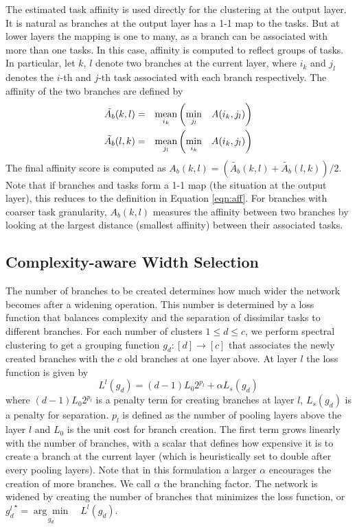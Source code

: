 \documentclass[10pt,twocolumn,letterpaper]{article}
\begin{document}
The estimated task affinity is used directly for the clustering at the output layer. It is natural as branches at the output layer has a 1-1 map to the tasks. But at lower layers the mapping is one to many, as a branch can be associated with more than one tasks. In this case, affinity is computed to reflect groups of tasks. In particular, let $k$, $l$ denote two branches at the current layer, where $i_{k}$ and $j_{l}$ denotes the $i$-th and $j$-th task associated with each branch respectively. The affinity of the two branches are defined by
\begin{eqnarray}
\vspace{-1mm}
\label{eqn:between_sep}
\tilde{A_b}(k, l) &=& \underset{i_k}{\mbox{mean}}\left(\underset{j_l}{\min}\quad {A(i_{k}, j_{l})}\right) \\
\tilde{A_b}(l, k) &=& \underset{j_l}{\mbox{mean}}\left(\underset{i_k}{\min}\quad {A(i_{k}, j_{l})}\right)
\vspace{-1mm}
\end{eqnarray}
The final affinity score is computed as $A_b(k, l) = (\tilde{A_b}(k, l) + \tilde{A_b}(l, k))/2$.
Note that if branches and tasks form a 1-1 map (the situation at the output layer), %
this
reduces to the definition in Equation \ref{eqn:aff}. For branches with coarser task granularity, %
$A_b(k, l)$
measures the affinity between two branches by looking at the largest distance (smallest affinity) between their associated tasks.

\subsection{Complexity-aware Width Selection}
\label{sec:width_sel}

The number of branches to be created determines how much wider the network becomes after a widening operation. This number is determined by a loss function that balances complexity and the separation of dissimilar tasks to different branches. For each number of clusters $1\leq d \leq c$, we perform spectral clustering to get a grouping function $g_d: [d] \to [c]$ that associates the newly created branches with the $c$ old branches at one layer above. At layer $l$ the loss function is given by
\begin{equation}
\label{eqn:cost_widen}
L^l(g_d) = (d-1) L_0 2^{p_l} + \alpha L_s(g_d)
\end{equation}
\noindent where $(d-1) L_0 2^{p_l}$ is a penalty term for creating branches at layer $l$, $L_s(g_d)$ is a penalty for separation. $p_l$ is defined as the number of pooling layers above the layer $l$ and $L_0$ is the unit cost for branch creation. The first term grows linearly with the number of branches, with a scalar that defines how expensive it is to create a branch at the current layer (which is heuristically set to double after every pooling layers). Note that in this formulation a larger $\alpha$ encourages the creation of more branches. We call $\alpha$ the branching factor. The network is widened by creating the number of branches that minimizes the loss function, or ${g_d^{l}}^{\star} = \underset{g_d}{\arg\min}\quad {L^l(g_d)}$.
\end{document}
